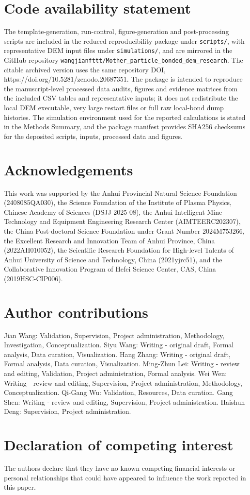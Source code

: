 \documentclass[5p,twocolumn]{elsarticle}
\begin{document}
\section{Code availability statement}

The template-generation, run-control, figure-generation and post-processing scripts are included in the reduced reproducibility package under \texttt{scripts/}, with representative DEM input files under \texttt{simulations/}, and are mirrored in the GitHub repository \texttt{wangjianfttt/Mother\_particle\_bonded\_dem\_research}. The citable archived version uses the same repository DOI, https://doi.org/10.5281/zenodo.20687351. The package is intended to reproduce the manuscript-level processed data audits, figures and evidence matrices from the included CSV tables and representative inputs; it does not redistribute the local DEM executable, very large restart files or full raw local-bond dump histories. The simulation environment used for the reported calculations is stated in the Methods Summary, and the package manifest provides SHA256 checksums for the deposited scripts, inputs, processed data and figures.


\section{Acknowledgements}

This work was supported by the Anhui Provincial Natural Science Foundation (2408085QA030), the Science Foundation of the Institute of Plasma Physics, Chinese Academy of Sciences (DSJJ-2025-08), the Anhui Intelligent Mine Technology and Equipment Engineering Research Center (AIMTEERC202307), the China Post-doctoral Science Foundation under Grant Number 2024M753266, the Excellent Research and Innovation Team of Anhui Province, China (2022AH010052), the Scientific Research Foundation for High-level Talents of Anhui University of Science and Technology, China (2021yjrc51), and the Collaborative Innovation Program of Hefei Science Center, CAS, China (2019HSC-CIP006).


\section{Author contributions}

Jian Wang: Validation, Supervision, Project administration, Methodology, Investigation, Conceptualization. Siyu Wang: Writing - original draft, Formal analysis, Data curation, Visualization. Hang Zhang: Writing - original draft, Formal analysis, Data curation, Visualization. Ming-Zhun Lei: Writing - review and editing, Validation, Project administration, Formal analysis. Wei Wen: Writing - review and editing, Supervision, Project administration, Methodology, Conceptualization. Qi-Gang Wu: Validation, Resources, Data curation. Gang Shen: Writing - review and editing, Supervision, Project administration. Haishun Deng: Supervision, Project administration.


\section{Declaration of competing interest}

The authors declare that they have no known competing financial interests or personal relationships that could have appeared to influence the work reported in this paper.





\end{document}
